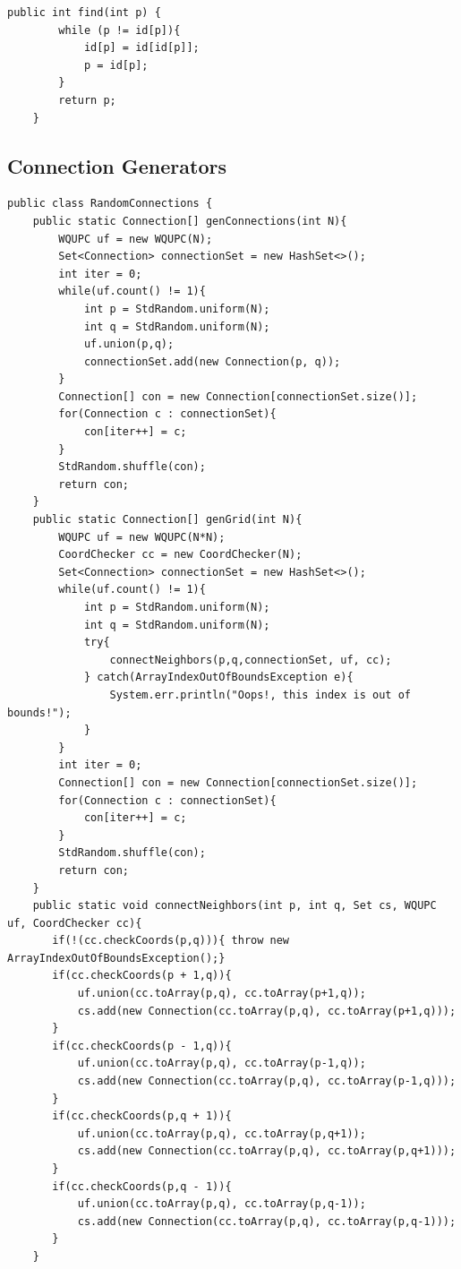 \documentclass{article}
\begin{document}
\begin{lstlisting}[caption=find function in WQUPC, label=find]
 public int find(int p) {
        while (p != id[p]){
            id[p] = id[id[p]];
            p = id[p];
        }
        return p;
    }
\end{lstlisting}
\pagebreak

\subsection{Connection Generators}

\begin{lstlisting}[caption=genConnections and genGrid, label=lst:gen]
public class RandomConnections {
    public static Connection[] genConnections(int N){
        WQUPC uf = new WQUPC(N);
        Set<Connection> connectionSet = new HashSet<>();
        int iter = 0;
        while(uf.count() != 1){
            int p = StdRandom.uniform(N);
            int q = StdRandom.uniform(N);
            uf.union(p,q);
            connectionSet.add(new Connection(p, q));
        }
        Connection[] con = new Connection[connectionSet.size()];
        for(Connection c : connectionSet){
            con[iter++] = c;
        }
        StdRandom.shuffle(con);
        return con;
    }
    public static Connection[] genGrid(int N){
        WQUPC uf = new WQUPC(N*N);
        CoordChecker cc = new CoordChecker(N);
        Set<Connection> connectionSet = new HashSet<>();
        while(uf.count() != 1){
            int p = StdRandom.uniform(N);
            int q = StdRandom.uniform(N);
            try{
                connectNeighbors(p,q,connectionSet, uf, cc);
            } catch(ArrayIndexOutOfBoundsException e){
                System.err.println("Oops!, this index is out of bounds!");
            }
        }
        int iter = 0;
        Connection[] con = new Connection[connectionSet.size()];
        for(Connection c : connectionSet){
            con[iter++] = c;
        }
        StdRandom.shuffle(con);
        return con;
    }
    public static void connectNeighbors(int p, int q, Set cs, WQUPC uf, CoordChecker cc){
       if(!(cc.checkCoords(p,q))){ throw new ArrayIndexOutOfBoundsException();}
       if(cc.checkCoords(p + 1,q)){
           uf.union(cc.toArray(p,q), cc.toArray(p+1,q));
           cs.add(new Connection(cc.toArray(p,q), cc.toArray(p+1,q)));
       }
       if(cc.checkCoords(p - 1,q)){
           uf.union(cc.toArray(p,q), cc.toArray(p-1,q));
           cs.add(new Connection(cc.toArray(p,q), cc.toArray(p-1,q)));
       }
       if(cc.checkCoords(p,q + 1)){
           uf.union(cc.toArray(p,q), cc.toArray(p,q+1));
           cs.add(new Connection(cc.toArray(p,q), cc.toArray(p,q+1)));
       }
       if(cc.checkCoords(p,q - 1)){
           uf.union(cc.toArray(p,q), cc.toArray(p,q-1));
           cs.add(new Connection(cc.toArray(p,q), cc.toArray(p,q-1)));
       }
    }
\end{lstlisting}
\end{document}
